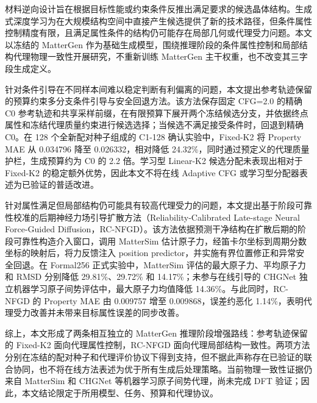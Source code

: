 \begin{ChineseAbstract}

材料逆向设计旨在根据目标性能或约束条件反推出满足要求的候选晶体结构。生成式深度学习为在大规模结构空间中直接产生候选提供了新的技术路径，但条件属性控制精度有限，且满足属性条件的结构仍可能存在局部几何或代理受力问题。本文以冻结的 MatterGen 作为基础生成模型，围绕推理阶段的条件属性控制和局部结构代理物理一致性开展研究，不重新训练 MatterGen 主干权重，也不改变其三字段生成定义。

针对条件引导在不同样本间难以稳定判断有利偏离的问题，本文提出参考轨迹保留的预算约束多分支条件引导与安全回退方法。该方法保存固定 CFG=2.0 的精确 C0 参考轨迹和共享采样前缀，在有限预算下展开两个冻结候选分支，并依据终点属性和冻结代理质量约束进行候选选择；当候选不满足接受条件时，回退到精确 C0。在 128 个全新配对种子组成的 C1-128 确认实验中，Fixed-K2 将 Property MAE 从 0.034796 降至 0.026332，相对降低 24.32\%，同时通过预定义的代理质量护栏，生成预算约为 C0 的 2.2 倍。学习型 Linear-K2 候选分配未表现出相对于 Fixed-K2 的稳定额外优势，因此本文不将在线 Adaptive CFG 或学习型分配器表述为已验证的普适改进。

针对属性满足但局部结构仍可能具有较高代理受力的问题，本文提出基于阶段可靠性校准的后期神经力场引导扩散方法（Reliability-Calibrated Late-stage Neural Force-Guided Diffusion，RC-NFGD）。该方法依据预测干净结构在扩散后期的阶段可靠性构造介入窗口，调用 MatterSim 估计原子力，经笛卡尔坐标到周期分数坐标的映射后，将力反馈注入 position predictor，并实施有界位置修正和异常安全回退。在 Formal256 正式实验中，MatterSim 评估的最大原子力、平均原子力和 RMSD 分别降低 29.81\%、29.72\% 和 14.17\%；未参与在线引导的 CHGNet 独立机器学习原子间势评估中，最大原子力均值降低 14.36\%。与此同时，RC-NFGD 的 Property MAE 由 0.009757 增至 0.009868，误差约恶化 1.14\%，表明代理受力改善并未带来目标属性误差的同步改善。

综上，本文形成了两条相互独立的 MatterGen 推理阶段增强路线：参考轨迹保留的 Fixed-K2 面向代理属性控制，RC-NFGD 面向代理局部结构一致性。两项方法分别在冻结的配对种子和代理评价协议下得到支持，但不据此声称存在已验证的联合协同，也不将在线方法表述为优于所有生成后处理策略。当前物理一致性证据仍来自 MatterSim 和 CHGNet 等机器学习原子间势代理，尚未完成 DFT 验证；因此，本文结论限定于所用模型、任务、预算和代理协议。

\end{ChineseAbstract}

